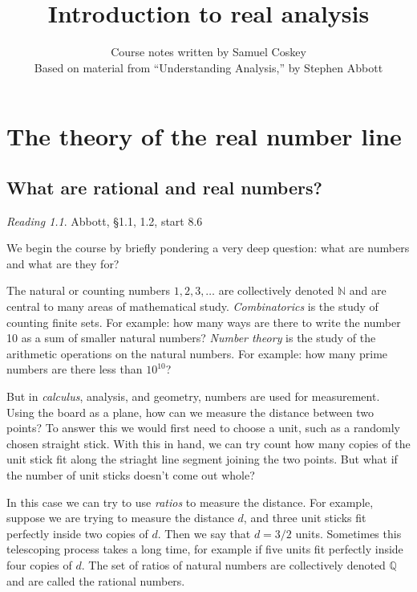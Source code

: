 \documentclass[11pt,oneside]{amsbook}
\title{Introduction to real analysis}
\author{Course notes written by Samuel Coskey\\Based on material from ``Understanding Analysis,'' by Stephen Abbott}
\newcommand{\NN}{\mathbb N}
\newcommand{\QQ}{\mathbb Q}
\theoremstyle{definition}
\theoremstyle{plain}
\theoremstyle{definition}
\theoremstyle{remark}
\newtheorem*{reading}{Reading}
\numberwithin{equation}{section}
\numberwithin{figure}{section}
\begin{document}
\maketitle

\tableofcontents

\chapter{The theory of the real number line}

\section{What are rational and real numbers?}

\begin{reading}
  Abbott, \S 1.1, 1.2, start 8.6
\end{reading}


We begin the course by briefly pondering a very deep question: what are numbers and what are they for?

The natural or counting numbers $1,2,3,\ldots$ are collectively denoted $\NN$ and are central to many areas of mathematical study. \emph{Combinatorics} is the study of counting finite sets. For example: how many ways are there to write the number 10 as a sum of smaller natural numbers? \emph{Number theory} is the study of the arithmetic operations on the natural numbers. For example: how many prime numbers are there less than $10^{10}$?

But in \emph{calculus}, analysis, and geometry, numbers are used for measurement. Using the board as a plane, how can we measure the distance between two points? To answer this we would first need to choose a unit, such as a randomly chosen straight stick. With this in hand, we can try count how many copies of the unit stick fit along the striaght line segment joining the two points. But what if the number of unit sticks doesn't come out whole?

In this case we can try to use \emph{ratios} to measure the distance. For example, suppose we are trying to measure the distance $d$, and three unit sticks fit perfectly inside two copies of $d$. Then we say that $d=3/2$ units. Sometimes this telescoping process takes a long time, for example if five units fit perfectly inside four copies of $d$. The set of ratios of natural numbers are collectively denoted $\QQ$ and are called the rational numbers.
\end{document}
